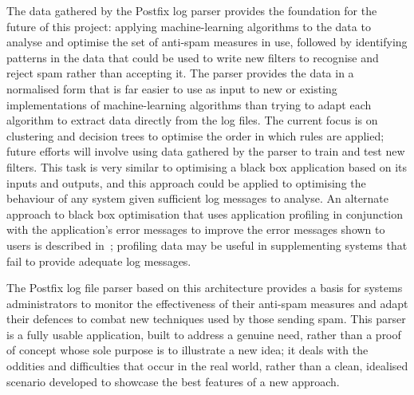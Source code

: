 \documentclass{svmult}
\begin{document}
The data gathered by the Postfix log parser provides the foundation for the
future of this project: applying machine-learning algorithms to the data to
analyse and optimise the set of anti-spam measures in use, followed by
identifying patterns in the data that could be used to write new filters to
recognise and reject spam rather than accepting it.  The parser provides
the data in a normalised form that is far easier to use as input to new or
existing implementations of machine-learning algorithms than trying to
adapt each algorithm to extract data directly from the log files.  The
current focus is on clustering and decision trees to optimise the order in
which rules are applied; future efforts will involve using data gathered by
the parser to train and test new filters.  This task is very similar to
optimising a black box application based on its inputs and outputs, and
this approach could be applied to optimising the behaviour of any system
given sufficient log messages to analyse.  An alternate approach to black
box optimisation that uses application profiling in conjunction with the
application's error messages to improve the error messages shown to users
is described in~\cite{black-box-error-reporting}; profiling data may be
useful in supplementing systems that fail to provide adequate log messages.

The Postfix log file parser based on this architecture provides a basis for
systems administrators to monitor the effectiveness of their anti-spam
measures and adapt their defences to combat new techniques used by those
sending spam.  This parser is a fully usable application, built to address
a genuine need, rather than a proof of concept whose sole purpose is to
illustrate a new idea; it deals with the oddities and difficulties that
occur in the real world, rather than a clean, idealised scenario developed
to showcase the best features of a new approach.



\end{document}
